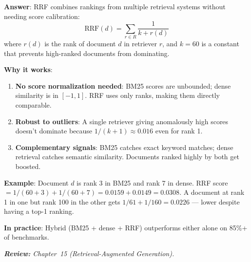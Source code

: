 \begin{questionbox}
\textbf{Answer}: RRF combines rankings from multiple retrieval systems without needing score calibration: 
\[
\text{RRF}(d) = \sum_{r \in R} \frac{1}{k + r(d)}
\]
 where $r(d)$ is the rank of document $d$ in retriever $r$, and $k=60$ is a constant that prevents high-ranked documents from dominating.

\textbf{Why it works}:

\begin{enumerate}
  \item \textbf{No score normalization needed}: BM25 scores are unbounded; dense similarity is in $[-1, 1]$. RRF uses only ranks, making them directly comparable.
  \item \textbf{Robust to outliers}: A single retriever giving anomalously high scores doesn’t dominate because $1/(k+1) \approx 0.016$ even for rank 1.
  \item \textbf{Complementary signals}: BM25 catches exact keyword matches; dense retrieval catches semantic similarity. Documents ranked highly by both get boosted.
\end{enumerate}

\textbf{Example}: Document $d$ is rank 3 in BM25 and rank 7 in dense. RRF score $= 1/(60+3) + 1/(60+7) = 0.0159 + 0.0149 = 0.0308$. A document at rank 1 in one but rank 100 in the other gets $1/61 + 1/160 = 0.0226$ --- lower despite having a top-1 ranking.

\textbf{In practice}: Hybrid (BM25 + dense + RRF) outperforms either alone on 85\%+ of benchmarks.

\emph{\textbf{Review:} Chapter~15 (Retrieval-Augmented Generation).}
\end{questionbox}


